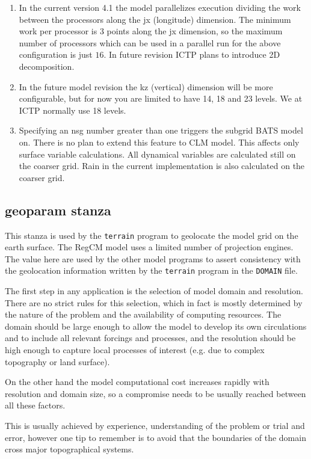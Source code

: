 \begin{enumerate}
\item In the current version 4.1 the model parallelizes execution dividing
the work between the processors along the jx (longitude) dimension. The
minimum work per processor is 3 points along the jx dimension, so the maximum
number of processors which can be used in a parallel run for the above
configuration is just $16$. In future revision ICTP plans to introduce 2D
decomposition.
\item In the future model revision the kz (vertical) dimension will be
more configurable, but for now you are limited to have 14, 18 and 23 levels.
We at ICTP normally use 18 levels.
\item Specifying an nsg number greater than one triggers the subgrid BATS model
on. There is no plan to extend this feature to CLM model. This affects only
surface variable calculations. All dynamical variables are calculated still
on the coarser grid. Rain in the current implementation is also calculated on
the coarser grid.
\end{enumerate}

\subsection{geoparam stanza}
\label{geoparam}

This stanza is used by the \verb=terrain= program to geolocate the model grid
on the earth surface. The RegCM model uses a limited number of projection
engines. The value here are used by the other model programs to assert
consistency with the geolocation information written by the \verb=terrain=
program in the \verb=DOMAIN= file.

The first step in any application is the selection of model domain and
resolution. There are no strict rules for this selection, which in fact is
mostly determined by the nature of the problem and the availability of
computing resources. The domain should be large enough to allow the model to
develop its own circulations and to include all relevant forcings and
processes, and the resolution should be high enough to capture local processes
of interest (e.g. due to complex topography or land surface).

On the other hand the model computational cost increases rapidly with
resolution and domain size, so a compromise needs to be usually reached
between all these factors.

This is usually achieved by experience, understanding of the problem or
trial and error, however one tip to remember is to avoid that the boundaries
of the domain cross major topographical systems.

